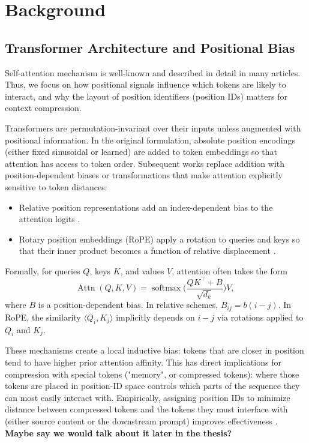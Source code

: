 \chapter{Background}


\section{Transformer Architecture and Positional Bias}

Self-attention mechanism is well-known and described in detail in many articles. Thus, we focus on how positional signals influence which tokens are likely to interact, and why the layout of position identifiers (position IDs) matters for context compression.

Transformers are permutation-invariant over their inputs unless augmented with positional information. In the original formulation, absolute position encodings \cite{vaswani_attention_2017} (either fixed sinusoidal or learned) are added to token embeddings so that attention has access to token order. 
Subsequent works replace addition with position-dependent biases or transformations that make attention explicitly sensitive to token distances:

\begin{itemize}
  \item Relative position representations add an index-dependent bias to the attention logits \cite{shaw_relative_2018}.
  \item Rotary position embeddings (RoPE) apply a rotation to queries and keys so that their inner product becomes a function of relative displacement \cite{su_roformer_2021}.
\end{itemize}

Formally, for queries \(Q\), keys \(K\), and values \(V\), attention often takes the form
\[
\operatorname{Attn}(Q,K,V) = \operatorname{softmax}\Big( \frac{QK^\top + B}{\sqrt{d_k}} \Big) V,\
\]
where \(B\) is a position-dependent bias. In relative schemes, \(B_{ij} = b(i-j)\). In RoPE, the similarity \(\langle Q_i, K_j\rangle\) implicitly depends on \(i-j\) via rotations applied to \(Q_i\) and \(K_j\).

These mechanisms create a local inductive bias: tokens that are closer in position tend to have higher prior attention affinity.
This has direct implications for compression with special tokens ("memory", or compressed tokens): where those tokens are placed in position-ID space controls which parts of the sequence they can most easily interact with. 
Empirically, assigning position IDs to minimize distance between compressed tokens and the tokens they must interface with (either source content or the downstream prompt) improves effectiveness \cite{zhao_position_2025}. 
\textbf{Maybe say we would talk about it later in the thesis?}

